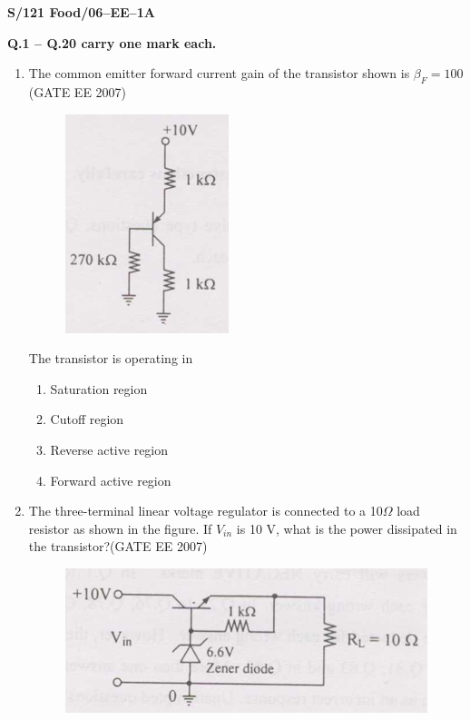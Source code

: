 \documentclass[a4paper,10pt]{exam}
\theoremstyle{remark}
\begin{document}
\vfill
\raggedright{\textbf{S/121 Food/06--EE--1A}}\\
\newpage
\begin{center}
    \textbf{Q.1 – Q.20 carry one mark each.}
\end{center}
\vspace{1em}
\begin{enumerate}
   

\item   The common emitter forward current gain of the transistor shown is $\beta_F = 100 $  \hfill{(GATE EE 2007)} 

\begin{figure}[H]
    \centering
    \includegraphics[width=0.4\linewidth]{figs/Q1.png} \caption{}     \label{fig:myfigure}
   
\end{figure}

\raggedright{The transistor is operating in}
\begin{multicols}{2}
\begin{enumerate}
\item Saturation region
\item Cutoff region
\item Reverse active region
\item Forward active region
\end{enumerate}
\end{multicols}
\vspace{0.5cm}
\item   The three-terminal linear voltage regulator is connected to a 10\( \Omega \)
 load resistor as shown in the figure. If \( V_{in} \)
 is 10 V, what is the power dissipated in the transistor?\hfill{(GATE EE 2007)} 
\begin{figure}[H]
    \centering
    \includegraphics[width=0.5\linewidth]{figs/Q 2.png} \caption{}     \label{fig:myfigure}
   

\end{figure}
\end{enumerate}
\end{document}
